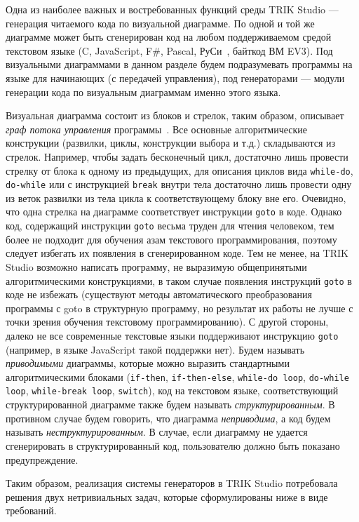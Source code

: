 \documentclass[conference]{IEEEtran}
\begin{document}
Одна из наиболее важных и востребованных функций среды TRIK Studio --- генерация читаемого кода по визуальной диаграмме. По одной и той же диаграмме может быть сгенерирован код на любом поддерживаемом средой текстовом языке (C, JavaScript, F\#, Pascal, РуСи~\cite{тереховотечественные}, байткод ВМ EV3). Под визуальными диаграммами в данном разделе будем подразумевать программы на языке для начинающих (с передачей управления), под генераторами --- модули генерации кода по визуальным диаграммам именно этого языка.

Визуальная диаграмма состоит из блоков и стрелок, таким образом, описывает \textit{граф потока управления} программы~\cite{steven1997advanced}. Все основные алгоритмические конструкции (развилки, циклы, конструкции выбора и т.д.) складываются из стрелок. Например, чтобы задать бесконечный цикл, достаточно лишь провести стрелку от блока к одному из предыдущих, для описания циклов вида \texttt{while-do}, \texttt{do-while} или с инструкцией \texttt{break} внутри тела достаточно лишь провести одну из веток развилки из тела цикла к соответствующему блоку вне его. Очевидно, что одна стрелка на диаграмме соответствует инструкции \texttt{goto} в коде. Однако код, содержащий инструкции \texttt{goto} весьма труден для чтения человеком, тем более не подходит для обучения азам текстового программирования, поэтому следует избегать их появления в сгенерированном коде. Тем не менее, на TRIK Studio возможно написать программу, не выразимую общепринятыми алгоритмическими конструкциями, в таком случае появления инструкций \texttt{goto} в коде не избежать (существуют методы автоматического преобразования программы с goto в структурную программу, но результат их работы не лучше с точки зрения обучения текстовому программированию). С другой стороны, далеко не все современные текстовые языки поддерживают инструкцию \texttt{goto} (например, в языке JavaScript такой поддержки нет). Будем называть \textit{приводимыми} диаграммы, которые можно выразить стандартными алгоритмическими блоками (\texttt{if-then}, \texttt{if-then-else}, \texttt{while-do loop}, \texttt{do-while loop}, \texttt{while-break loop}, \texttt{switch}), код на текстовом языке, соответствующий структурированной диаграмме также будем называть \textit{структурированным}. В противном случае будем говорить, что диаграмма \textit{неприводима}, а код будем называть \textit{неструктурированным}. В случае, если диаграмму не удается сгенерировать в структурированный код, пользователю должно быть показано предупреждение.

Таким образом, реализация системы генераторов в TRIK Studio потребовала решения двух нетривиальных задач, которые сформулированы ниже в виде требований.
\end{document}
